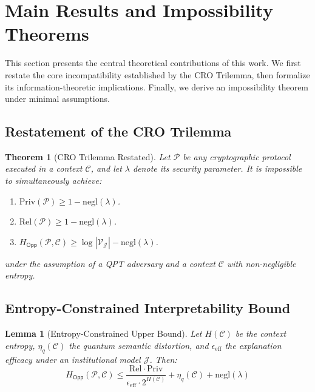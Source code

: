 \documentclass[preprint,12pt]{elsarticle}
\newtheorem{theorem}{Theorem}[section]
\newtheorem{lemma}{Lemma}[section]
\newcommand{\negl}{\mathrm{negl}}
\begin{document}
    \section{Main Results and Impossibility Theorems}\label{sec:main_results}

            This section presents the central theoretical contributions of this work. We first restate the core incompatibility established by the CRO Trilemma, then formalize its information-theoretic implications. Finally, we derive an impossibility theorem under minimal assumptions.

        \subsection{Restatement of the CRO Trilemma}

            \begin{theorem}[CRO Trilemma Restated]\label{thm:cro_restate}
                Let $\mathcal{P}$ be any cryptographic protocol executed in a context $\mathcal{C}$, and let $\lambda$ denote its security parameter. It is impossible to simultaneously achieve:
                \begin{enumerate}
                    \item $\mathrm{Priv}(\mathcal{P}) \geq 1 - \negl(\lambda)$.
                    \item $\mathrm{Rel}(\mathcal{P}) \geq 1 - \negl(\lambda)$.
                    \item $H_{\mathsf{Opp}}(\mathcal{P}, \mathcal{C}) \geq \log |\mathcal{V}_{\mathcal{J}}| - \negl(\lambda)$.
                \end{enumerate}
                under the assumption of a QPT adversary and a context $\mathcal{C}$ with non-negligible entropy.
            \end{theorem}

        \subsection{Entropy-Constrained Interpretability Bound}

            \begin{lemma}[Entropy-Constrained Upper Bound]\label{lem:entropy_bound}
                Let $H(\mathcal{C})$ be the context entropy, $\eta_q(\mathcal{C})$ the quantum semantic distortion, and $\epsilon_{\mathrm{eff}}$ the explanation efficacy under an institutional model $\mathcal{J}$. Then:
                \begin{equation}
                    H_{\mathsf{Opp}}(\mathcal{P}, \mathcal{C}) \leq \frac{\mathrm{Rel} \cdot \mathrm{Priv}}{\epsilon_{\mathrm{eff}} \cdot 2^{H(\mathcal{C})}} + \eta_q(\mathcal{C}) + \negl(\lambda)
                \end{equation}
            \end{lemma}
\end{document}
